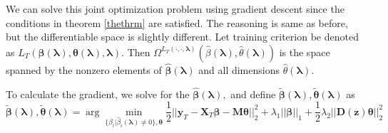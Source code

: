 \documentclass[10pt,letterpaper]{article}
\begin{document}
We can solve this joint optimization problem using gradient descent since the conditions in theorem \ref{thethrm} are satisfied. The reasoning is same as before, but the differentiable space is slightly different. Let training criterion be denoted as $L_T(\boldsymbol \beta(\boldsymbol \lambda), \boldsymbol \theta(\boldsymbol \lambda), \boldsymbol \lambda)$. Then $\Omega^{L_T(\cdot, \cdot, \boldsymbol{\lambda})}(\hat{\beta}\left(\boldsymbol{\lambda}\right), \hat{\theta}\left(\boldsymbol{\lambda}\right))$ is the space spanned by the nonzero elements of $\hat{\boldsymbol\beta}(\boldsymbol{\lambda})$ and all dimensions $\hat{\theta}\left(\boldsymbol{\lambda} \right)$.

To calculate the gradient, we solve for the $\hat{\boldsymbol{\beta}}(\boldsymbol{\lambda}),$ and define $\tilde{\boldsymbol{\beta}}(\boldsymbol{\lambda}), \tilde{\boldsymbol{\theta}}(\boldsymbol{\lambda})$ as
\begin{equation}
\tilde{\boldsymbol{\beta}}(\boldsymbol{\lambda}),
\tilde{\boldsymbol{\theta}}(\boldsymbol{\lambda}) =
\arg\min_{\{\beta_i | \hat{\beta}_i(\boldsymbol{\lambda}) \ne 0 \} , \boldsymbol{\theta}}
\frac{1}{2} \bigl\lvert\bigl\lvert
\boldsymbol{y}_T
- \boldsymbol{X}_T\boldsymbol{\beta}
- \boldsymbol{M} \boldsymbol{\theta} \bigl\rvert\bigl\rvert^2_2
+ \lambda_1 \lvert\lvert \boldsymbol{\beta}
\rvert \rvert_1
+ \frac{1}{2} \lambda_2 \lvert\lvert \boldsymbol{D}(\boldsymbol{z}) \boldsymbol{\theta} \rvert \rvert_2^2
\end{equation}
\end{document}
